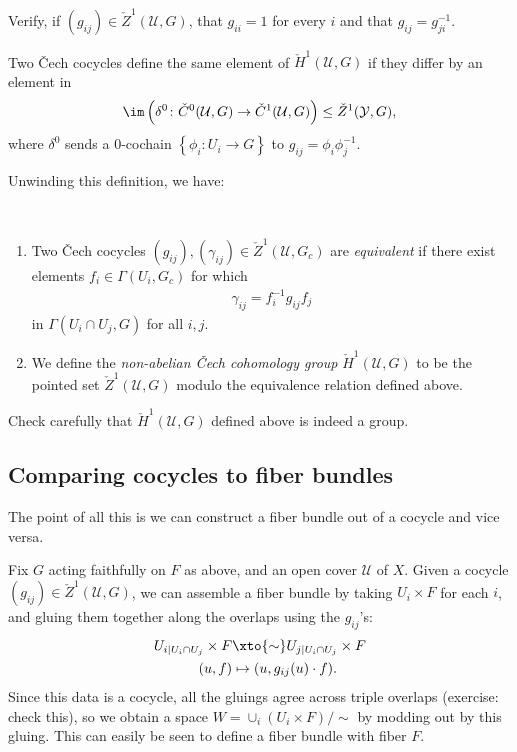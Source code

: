 \documentclass[11pt]{book}
\begin{document}
\begin{exercise} Verify, if $(g_{ij}) \in \check{Z}^1(\mathcal{U},G)$, that $g_{ii} = 1$ for every $i$ and that $g_{ij} = g_{ji}^{-1}$.
\end{exercise}

Two \v{C}ech cocycles define the same element of $\check{H}^1(\mathcal{U},G)$ if they differ by an element in 
\[
\im \left( \delta^0 \colon \check{C}^0(\mathcal{U},G) \to \check{C}^1(\mathcal{U},G) \right) \le \check{Z}^1(\mathcal{Y},G),\]
where $\delta^0$ sends a $0$-cochain $\left\{ \phi_i \colon U_i \to G \right\}$ to $g_{ij} = \phi_i \phi_j^{-1}$.

Unwinding this definition, we have:

\begin{definition}\label{def:non-abelian-cech-h1} \,
\begin{enumerate}
    \item Two \v{C}ech cocycles $(g_{ij}), (\gamma_{ij}) \in \check{Z}^1(\mathcal{U},G_c)$ are \emph{equivalent} if there exist elements $f_i \in \Gamma(U_i,G_c)$ for which
    \begin{align*}
        \gamma_{ij} = f_i^{-1} g_{ij} f_j
    \end{align*}
    in $\Gamma(U_i\cap U_j,G)$ for all $i,j$.
    \item We define the \emph{non-abelian \v{C}ech cohomology group} $\check{H}^1(\mathcal{U},G)$ to be the pointed set $\check{Z}^1(\mathcal{U},G)$ modulo the equivalence relation defined above.
\end{enumerate}
\end{definition}

\begin{exercise} Check carefully that $\check{H}^1(\mathcal{U},G)$ defined above is indeed a group.
\end{exercise}

\subsection{Comparing cocycles to fiber bundles}

The point of all this is we can construct a fiber bundle out of a cocycle and vice versa.

\begin{construction}
\label{constr:fiber-bundle-from-cocycle}
Fix $G$ acting faithfully on $F$ as above, and an open cover $\mathcal{U}$ of $X$. Given a cocycle $(g_{ij})\in \check{Z}^1(\mathcal{U},G)$, we can assemble a fiber bundle by taking $U_i \times F$ for each $i$, and gluing them together along the overlaps using the $g_{ij}$'s:
\begin{align*}
    U_{i|U_i\cap U_j} \times F &\xto{\sim} U_{j|U_i\cap U_j} \times F \\
    (u,f) &\mapsto (u, g_{ij}(u)\cdot f).
\end{align*}
%
Since this data is a cocycle, all the gluings agree across triple overlaps (exercise: check this), so we obtain a space $W = \cup_i (U_i \times F) /\sim$ by modding out by this gluing. This can easily be seen to define a fiber bundle with fiber $F$.
\end{construction}
\end{document}
